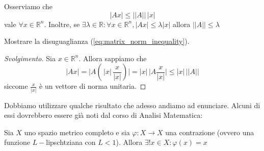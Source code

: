 \begin{remark}
    Osserviamo che
    \begin{equation}
    |Ax| \leq || A || \, |x|
    \label{eq:matrix_norm_inequality}
    \end{equation}
    vale $\forall x \in \mathbb{R}^n$. Inoltre, se $\exists \lambda \in \mathbb{R} : \forall x \in \mathbb{R}^n, |Ax| \leq \lambda |x|$ allora $|| A || \leq \lambda$
\end{remark}
\begin{exercise}
    Mostrare la disuguaglianza (\ref{eq:matrix_norm_inequality}).
\end{exercise}
\begin{proof}[Svolgimento]
    Sia $x \in \mathbb{R}^n$. Allora sappiamo che
    $$
    |Ax| = \big|A( \, |x| \, \frac{x}{|x|} )\big| = |x| \, \big|A\frac{x}{|x|}\big| \leq |x| \, || A ||
    $$
    siccome $\frac{x}{|x|}$ è un vettore di norma unitaria.
\end{proof}
Dobbiamo utilizzare qualche risultato che adesso andiamo ad enunciare. Alcuni di essi dovrebbero essere già noti dal corso di Analisi Matematica:
\begin{theorem}
	Sia $X$ uno spazio metrico completo e sia $\varphi: X \to X$ una contrazione (ovvero una funzione $L-$lipschtziana con $L < 1$). Allora $\exists ! x \in X : \varphi(x) = x$
\end{theorem}
